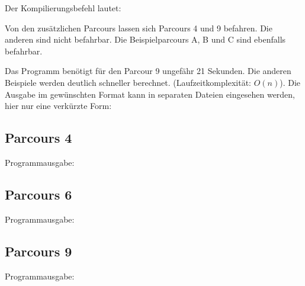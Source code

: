 Der Kompilierungsbefehl lautet:


Von den zusätzlichen Parcours lassen sich Parcours 4 und 9 befahren. Die anderen sind nicht befahrbar. Die Beispielparcours A, B und C sind ebenfalls befahrbar.

Das Programm benötigt für den Parcour 9 ungefähr 21 Sekunden. Die anderen Beispiele werden deutlich schneller berechnet. (Laufzeitkomplexität: \(O(n)\)).
Die Ausgabe im gewünschten Format kann in separaten Dateien eingesehen werden, hier nur eine verkürzte Form:
\subsection{Parcours 4}
	Programmausgabe:\\
\subsection{Parcours 6}
	Programmausgabe:\\
\subsection{Parcours 9}
	Programmausgabe:\\

